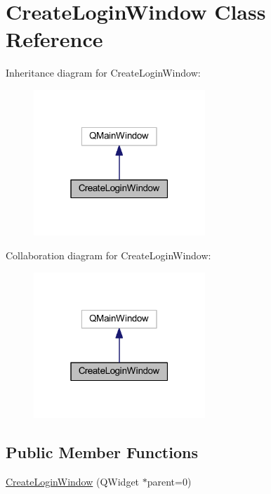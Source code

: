 \hypertarget{class_create_login_window}{}\section{Create\+Login\+Window Class Reference}
\label{class_create_login_window}


Inheritance diagram for Create\+Login\+Window\+:\nopagebreak
\begin{figure}[H]
\begin{center}
\leavevmode
\includegraphics[width=183pt]{class_create_login_window__inherit__graph}
\end{center}
\end{figure}


Collaboration diagram for Create\+Login\+Window\+:\nopagebreak
\begin{figure}[H]
\begin{center}
\leavevmode
\includegraphics[width=183pt]{class_create_login_window__coll__graph}
\end{center}
\end{figure}
\subsection*{Public Member Functions}
\begin{DoxyCompactItemize}
\item 
\hyperlink{class_create_login_window_a5bddab7d05cb0e6b22dae4b96cc8ef13}{Create\+Login\+Window} (Q\+Widget $\ast$parent=0)
\end{DoxyCompactItemize}


